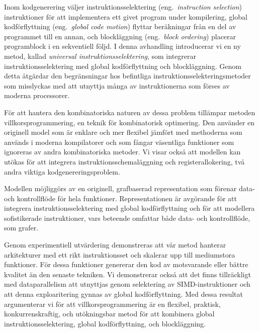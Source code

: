 %

\begin{sammanfattning}
  Inom kodgenerering v\"aljer instruktionsselektering (eng.\ \emph{instruction
    selection}) instruktioner f\"or att implementera ett givet program under
  kompilering, global kodf\"orflyttning (eng.\ \emph{global code motion})
  flyttar ber\"akningar fr\r{a}n en del av programmet till en annan, och
  blockl\"aggning (eng.\ \emph{block ordering}) placerar programblock i en
  sekventiell f\"oljd.
  I denna avhandling introducerar vi en ny metod, kallad \emph{universal
    instruktionsselektering}, som integrerar instruktionsselektering med global
  kodf\"orflyttning och blockl\"aggning.
  Genom detta \r{a}tg\"ardar den begr\"ansningar hos befintliga
  instruktionsselekteringsmetoder som misslyckas med att utnyttja m\r{a}nga av
  instruktionerna som f\"orses av moderna processorer.

  F\"or att hantera den kombinatoriska naturen av dessa problem till\"ampar
  metoden villkorsprogrammering, en teknik f\"or kombinatorisk optimering.
  Den anv\"ander en originell model som \"ar enklare och mer flexibel
  j\"amf\"ort med methoderna som anv\"ands i moderna kompilatorer och som
  f\r{a}ngar v\"asentliga funktioner som ignoreras av andra kombinatoriska
  metoder.
  Vi visar ocks\r{a} att modellen kan ut\"okas f\"or att integrera
  instruktionsschemal\"aggning och registerallokering, tv\r{a} andra viktiga
  kodgenereringsproblem.

  Modellen m\"ojligg\"ors av en originell, grafbaserad representation som
  f\"orenar data- och kontrollfl\"ode f\"or hela funktioner.
  Representationen \"ar avg\"orande f\"or att integrera instruktionsselektering
  med global kodf\"orflyttning och f\"or att modellera sofistikerade
  instruktioner, vars beteende omfattar b\r{a}de data- och kontrollfl\"ode, som
  grafer.

  Genom experimentiell utv\"ardering demonstreras att v\r{a}r metod hanterar
  arkitekturer med ett rikt instruktionsset och skalerar upp till mediumstora
  funktioner.
  F\"or dessa funktioner genererar den kod av motsvarande eller b\"attre
  kvalitet \"an den senaste tekniken.
  Vi demonstrerar ocks\r{a} att det finns tillr\"ackligt med dataparallelism att
  utnyttjas genom selektering av SIMD-instruktioner och att denna exploaritering
  gynnas av global kodf\"orflyttning.
  Med dessa resultat argumenterar vi f\"or att villkorsprogrammering \"ar en
  flexibel, praktisk, konkurrenskraftig, och ut\"okningsbar metod f\"or att
  kombinera global instruktionsselektering, global kodf\"orflyttning, och
  blockl\"aggning.
\end{sammanfattning}
